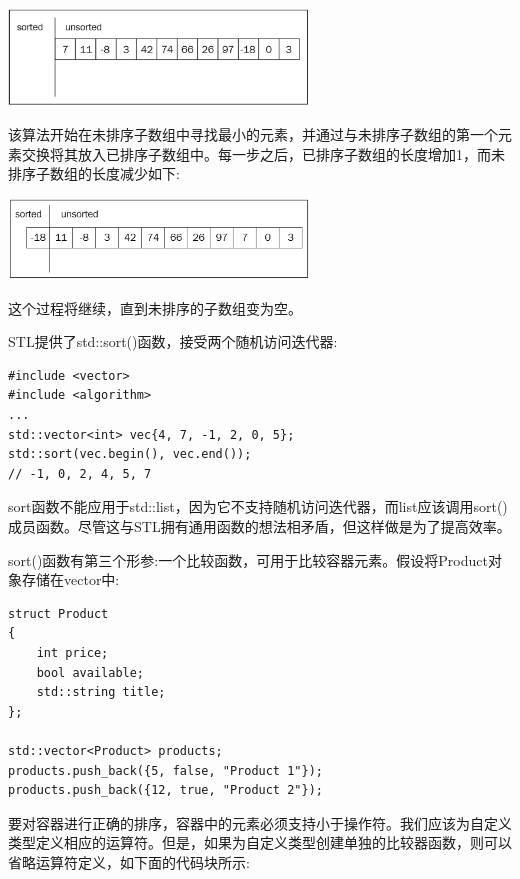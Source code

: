 \begin{center}
	\includegraphics[width=0.6\textwidth]{content/Section-2/Chapter-6/22}
\end{center}

该算法开始在未排序子数组中寻找最小的元素，并通过与未排序子数组的第一个元素交换将其放入已排序子数组中。每一步之后，已排序子数组的长度增加1，而未排序子数组的长度减少如下: \par

\begin{center}
	\includegraphics[width=0.6\textwidth]{content/Section-2/Chapter-6/23}
\end{center}

这个过程将继续，直到未排序的子数组变为空。 \par
STL提供了std::sort()函数，接受两个随机访问迭代器: \par

\begin{lstlisting}[caption={}]
#include <vector>
#include <algorithm>
...
std::vector<int> vec{4, 7, -1, 2, 0, 5};
std::sort(vec.begin(), vec.end());
// -1, 0, 2, 4, 5, 7
\end{lstlisting}

sort函数不能应用于std::list，因为它不支持随机访问迭代器，而list应该调用sort()成员函数。尽管这与STL拥有通用函数的想法相矛盾，但这样做是为了提高效率。 \par
sort()函数有第三个形参:一个比较函数，可用于比较容器元素。假设将Product对象存储在vector中: \par

\begin{lstlisting}[caption={}]
struct Product
{
	int price;
	bool available;
	std::string title;
};

std::vector<Product> products;
products.push_back({5, false, "Product 1"});
products.push_back({12, true, "Product 2"});
\end{lstlisting}

要对容器进行正确的排序，容器中的元素必须支持小于操作符。我们应该为自定义类型定义相应的运算符。但是，如果为自定义类型创建单独的比较器函数，则可以省略运算符定义，如下面的代码块所示: \par

